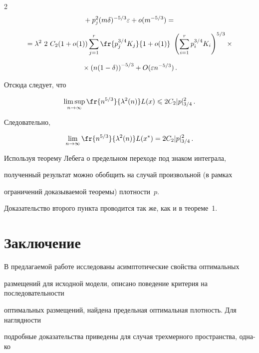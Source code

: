 \begin{multicols}{2}
\begin{multline*}
{}+ p_j^2 (m \delta)^{-5/3} \varepsilon +o(m^{-5/3}) ={}\\[6pt]


{}


=\lambda^2~ 2~ C_2(1+o(1))\suml{j=1}{r} \fr{p_j^{3/4} K_j }{1+o(1)}~


\left(\suml{i=1}{r} p_i^{3/4} K_i\right)^{5/3}\times{}\\[6pt]


{}\times \left(n(1-\delta)\right)^{-5/3}+O(\varepsilon n^{-5/3})\,.


\end{multline*}


Отсюда следует, что


$$


\lims{n \to \infty}\fr{n^{5/3}}{\lambda^2(n)}L(x)\leqslant 2C_2|p|_{3/4}^2\,.


$$


Следовательно,


$$


\limn\fr{n^{5/3}}{\lambda^2(n)}L(x^*)=2C_2|p|_{3/4}^2\,.


$$





Используя теорему Лебега о предельном переходе под знаком интеграла, 


полученный результат можно обобщить на случай произвольной (в рамках 


ограничений доказываемой теоремы) плотности~$p$.





Доказательство второго пункта проводится так же, как и в теореме~1.





\section{Заключение}





В предлагаемой работе исследованы асимптотические свойства оптимальных 


размещений для исходной модели, описано поведение критерия на последовательности 


оптимальных размещений, найдена предельная оптимальная плотность. Для наглядности 


подробные доказательства приведены для случая трехмерного пространства, одна-\linebreak ко 



\end{multicols}
